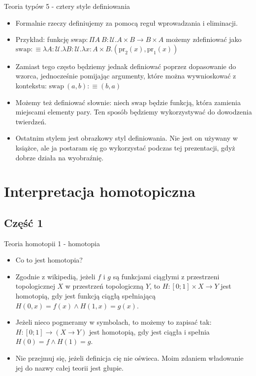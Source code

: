 \documentclass{beamer}
\newcommand{\defn}{:\equiv}
\newcommand{\U}{\mathcal{U}}
\newcommand{\prl}{\text{pr}_1}
\newcommand{\prr}{\text{pr}_2}
\begin{document}
\begin{frame}{Teoria typów 5 - cztery style definiowania}
\begin{itemize}
	\item Formalnie rzeczy definiujemy za pomocą reguł wprowadzania i eliminacji.
	\item Przykład: funkcję $\text{swap} : \Pi A\ B : \U. A \times B \to B \times A$ możemy zdefiniować jako $\text{swap} \defn \lambda A : \U.\lambda B : \U.\lambda x : A \times B. (\prr(x), \prl(x))$
	\item Zamiast tego często będziemy jednak definiować poprzez dopasowanie do wzorca, jednocześnie pomijając argumenty, które można wywnioskować z kontekstu: $\text{swap}\ (a, b) \defn (b, a)$
	\item Możemy też definiować słownie: niech $\text{swap}$ będzie funkcją, która zamienia miejscami elementy pary. Ten sposób będziemy wykorzystywać do dowodzenia twierdzeń.
	\item Ostatnim stylem jest obrazkowy styl definiowania. Nie jest on używany w książce, ale ja postaram się go wykorzystać podczas tej prezentacji, gdyż dobrze działa na wyobraźnię.
\end{itemize}
\end{frame}

\section{Interpretacja homotopiczna}

\subsection{Część 1}

\begin{frame}{Teoria homotopii 1 - homotopia}
\begin{itemize}
	\item Co to jest homotopia?
	\item Zgodnie z wikipedią, jeżeli $f$ i $g$ są funkcjami ciągłymi z przestrzeni topologicznej $X$ w przestrzeń topologiczną $Y$, to $H : [0; 1] \times X \to Y$ jest homotopią, gdy jest funkcją ciągłą spełniającą $H(0, x) = f(x) \land H(1, x) = g(x)$.
	\item Jeżeli nieco pogmeramy w symbolach, to możemy to zapisać tak: $H: [0; 1] \to (X \to Y)$ jest homotopią, gdy jest ciągła i spełnia $H(0) = f \land H(1) = g$.
	\item Nie przejmuj się, jeżeli definicja cię nie oświeca. Moim zdaniem władowanie jej do nazwy całej teorii jest głupie.
\end{itemize}
\end{frame}
\end{document}
